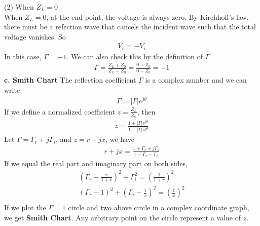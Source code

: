 \documentclass[a4paper]{article}
\begin{document}
(2) When $Z_L = 0$\\
When $Z_L = 0$, at the end point, the voltage is always zero. By Kirchhoff's law, there must be a refection wave that cancels the incident wave such that the total voltage vanishes. So\\
\begin{align*}
	V_r = - V_i
\end{align*}
In this case, $\Gamma = -1$. We can also check this by the definition of $\Gamma$
\begin{align*}
	\Gamma = \frac{Z_L + Z_0}{Z_L - Z_0} = \frac{0 + Z_0}{0 - Z_0} = -1
\end{align*}
{\bf c. Smith Chart}
The reflection coefficient $\Gamma$ is a complex number and we can write
\begin{align*}
	\Gamma = |\Gamma|e^{j \theta}
\end{align*}
If we define a normalized coefficient $z = \frac{Z_L}{Z_0}$, then
\begin{align*}
	z = \frac{1 + |\Gamma|e^{j \theta}} {1 - |\Gamma|e^{j \theta}}
\end{align*}
Let $ \Gamma = \Gamma_r + j \Gamma_i$, and $z = r + j x$, we have
\begin{align*}
	r + jx = \frac{1 + \Gamma_r + j \Gamma_i}{ 1 - \Gamma_r - \Gamma_i}
\end{align*}
If we equal the real part and imaginary part on both sides, 
\begin{align*}
	(\Gamma_r - \frac{r}{1+r})^2 + \Gamma^2_i = (\frac{1}{1+r})^2 \\
	(\Gamma_r - 1)^2 + (\Gamma_i - \frac{1}{x})^2 = (\frac{1}{x})^2\\
\end{align*}
If we plot the $\Gamma = 1$ circle and two above circle in a complex coordinate graph, we get {\bf Smith Chart}. Any arbitrary point on the circle represent a value of $z$. 
\end{document}

